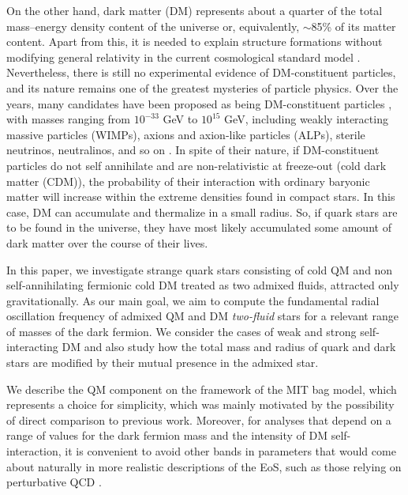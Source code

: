 \documentclass[universe,article,accept,moreauthors,pdftex]{Definitions/mdpi}
\begin{document}
On the other hand, dark matter (DM) represents about a quarter of the total mass--energy density content of the universe or, equivalently, $\sim$85\% of its matter content. Apart from this, it is needed to explain structure formations without modifying general relativity in the current cosmological standard model \cite{Bertone:2004pz,SDSS:2014iwm,Planck:2013pxb}. Nevertheless, there is still no experimental evidence of DM-constituent particles, and its nature remains one of the greatest mysteries of particle physics. Over the years, many candidates have been proposed as being DM-constituent particles%
, with masses ranging from $10^{-33}$ GeV to $10^{15}$ GeV, including weakly interacting massive particles (WIMPs), axions and axion-like particles (ALPs), sterile neutrinos, neutralinos, and so on \cite{Deliyergiyev:2019vti}. In spite of their nature, if DM-constituent particles %
 do not self annihilate and are non-relativistic at freeze-out (cold dark matter (CDM)), the probability of their interaction with ordinary baryonic matter will increase within the extreme densities found in compact stars. In this case, DM can accumulate and thermalize in a small radius. So, if quark stars are to be found in the universe, they have most likely accumulated some amount of dark matter over the course of their lives.

In this paper, we investigate strange quark stars consisting of cold QM and non self-annihilating fermionic cold DM treated as two admixed fluids, attracted only gravitationally. As our main goal, we aim to compute the fundamental radial oscillation frequency of admixed QM and DM {\it two-fluid} stars for a relevant range of masses of the dark fermion. We consider the cases of weak and strong self-interacting DM and also study how the total mass and radius of quark and dark stars are modified by their mutual presence in the admixed star.

We describe the QM component on the framework of the MIT bag model, which represents a choice for simplicity, which was mainly motivated by the possibility of direct comparison to previous work. Moreover, for analyses that depend on a range of values for the dark fermion mass and the intensity of DM self-interaction, it is  convenient to avoid other bands in parameters that would come about naturally in more realistic descriptions of the EoS, such as those relying on perturbative QCD \cite{Fraga:2001id,Fraga:2004gz,Kurkela:2009gj,Fraga:2013qra,Kurkela:2014vha,Fraga:2015xha,Ghisoiu:2016swa,Annala:2017llu,Gorda:2018gpy,Annala:2019puf,Gorda:2021kme}.
\end{document}

